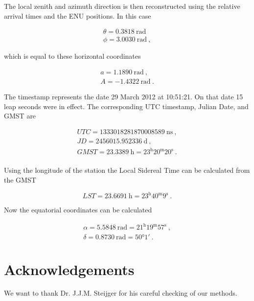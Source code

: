 The local zenith and azimuth direction is then reconstructed using the
relative arrival times and the ENU positions. In this case

\begin{equation}
    \begin{array}{l}
        \theta = \SI{0.3818}{\radian} \, \\
        \phi = \SI{3.0030}{\radian} \ ,
    \end{array}
\end{equation}

\noindent which is equal to these horizontal coordinates

\begin{equation}
    \begin{array}{l}
        a = \SI{1.1890}{\radian} \ , \\
        A = \SI{-1.4322}{\radian} \ .
    \end{array}
\end{equation}

The \gps timestamp represents the date 29 March 2012 at 10:51:21. On
that date 15 leap seconds were in effect. The corresponding UTC
timestamp, Julian Date, and GMST are

\begin{equation}
    \begin{array}{l}
        \mathit{UTC} = \SI{1333018281870008589}{\nano\second} \ , \\
        \mathit{JD} = \SI{2456015.952336}{\day} \ , \\
        \mathit{GMST} = \SI{23.3389}{\hour} = 23^\mathrm{h}20^\mathrm{m}20^\mathrm{s} \ . \\
    \end{array}
\end{equation}

Using the longitude of the station the Local Sidereal Time can be
calculated from the GMST

\begin{equation}
    \mathit{LST} = \SI{23.6691}{\hour} = 23^\mathrm{h}40^\mathrm{m}9^\mathrm{s} \ .
\end{equation}

Now the equatorial coordinates can be calculated

\begin{equation}
    \begin{array}{l}
        \alpha = \SI{5.5848}{\radian} = 21^\mathrm{h}19^\mathrm{m}57^\mathrm{s} \ , \\
        \delta = \SI{0.8730}{\radian} = \ang{50;1;} \ .
    \end{array}
\end{equation}


\section{Acknowledgements}

We want to thank Dr. J.J.M. Steijger for his careful checking of our
methods.

